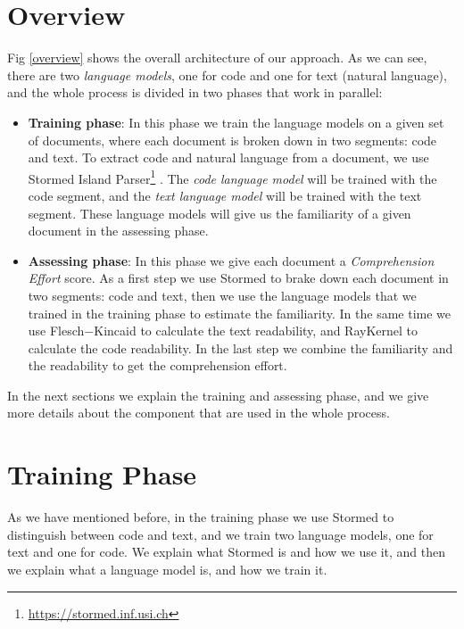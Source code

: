 \documentclass[12pt,mscthesis]{usiinfthesis}
\begin{document}
	\section{Overview}

	Fig \ref{overview} shows the overall architecture of our approach. As we can see, there are two \emph{language models}, one for code and one for text (natural language), and the whole process is divided in two phases that work in parallel: 
	\begin{itemize}

		\item \textbf{Training phase}: In this phase we train the language models on a given set of documents, where each document is broken down in two segments: code and text. To extract code and natural language from a document, we use Stormed Island Parser\footnote{\url{https://stormed.inf.usi.ch}} \cite{Ponz2015a}. The \emph{code language model} will be trained with the code segment, and the \emph{text language model} will be trained with the text segment. These language models will give us the familiarity of a given document in the assessing phase.


		\item \textbf{Assessing phase}: In this phase we give each document a \emph{Comprehension Effort} score. As a first step we use Stormed \cite{Ponz2015a} to brake down each document in two segments: code and text, then we use the language models that we trained in the training phase to estimate the familiarity. In the same time we use Flesch$-$Kincaid\cite{Kincaid} to calculate the text readability, and RayKernel \cite{Buse:2010:LMC:1850489.1850615} to calculate the code readability. In the last step we combine the familiarity and the readability to get the comprehension effort.
	
	\end{itemize}

	In the next sections we explain the training and assessing phase, and we give more details about the component that are used in the whole process.

	\section{Training Phase}

	As we have mentioned before, in the training phase we use Stormed to distinguish between code and text, and we train two language models, one for text and one for code. We explain what Stormed is and how we use it, and then we explain what a language model is, and how we train it.
\end{document}
